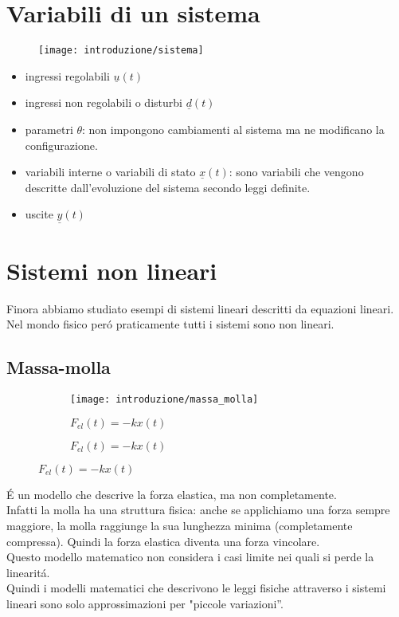 \documentclass[../main.tex]{subfiles}
\begin{document}
	\section{Variabili di un sistema}
			\begin{figure}[h!]
				\centering
				\texttt{[image: introduzione/sistema]}
			\end{figure}
			\begin{itemize}
				\item ingressi regolabili $ \underline u(t) $
				\item ingressi non regolabili o disturbi $ \underline d(t) $
				\item parametri $ \theta $: non impongono cambiamenti al sistema ma ne modificano la configurazione.
				\item variabili interne o variabili di stato $ \underline x(t) $: sono variabili che vengono descritte dall'evoluzione del sistema secondo leggi definite.
				\item uscite $ \underline y(t) $
			\end{itemize}
		
	\section{Sistemi non lineari}
		Finora abbiamo studiato esempi di sistemi lineari descritti da equazioni lineari. Nel mondo fisico per\'o praticamente tutti i sistemi sono non lineari.
		
	\subsection{Massa-molla}
		\begin{figure}[h!]
			\centering
			\begin{subfigure}[b]{0.4\linewidth}
				\texttt{[image: introduzione/massa\_molla]}
				\caption{$F_{el}(t)=-kx(t)$}
			\end{subfigure}
			\begin{subfigure}[b]{0.4\linewidth}
				\caption{$F_{el}(t)=-kx(t)$}
			\end{subfigure}
		\end{figure}
		\'E un modello che descrive la forza elastica, ma non completamente.\\ Infatti la molla ha una struttura fisica: anche se applichiamo una forza sempre maggiore, la molla raggiunge la sua lunghezza minima (completamente compressa). Quindi la forza elastica diventa una forza vincolare.\\
		Questo modello matematico non considera i casi limite nei quali si perde la linearit\'a.\\
		Quindi i modelli matematici che descrivono le leggi fisiche attraverso i sistemi lineari sono solo approssimazioni per "piccole variazioni''.
		
\end{document}
